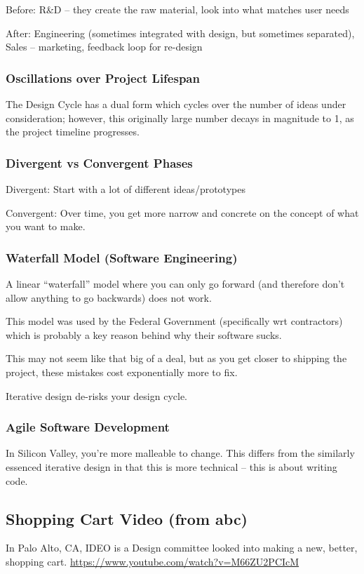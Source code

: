 Before: R\&D -- they create the raw material, look into what matches user needs

After: Engineering (sometimes integrated with design, but sometimes separated), Sales -- marketing, feedback loop for re-design

\subsubsection{Oscillations over Project Lifespan}
The Design Cycle has a dual form which cycles over the number of ideas under consideration; however, this originally large number decays in magnitude to 1, as the project timeline progresses.

\subsubsection{Divergent vs Convergent Phases}
Divergent: Start with a lot of different ideas/prototypes

Convergent: Over time, you get more narrow and concrete on the concept of what you want to make.

\subsubsection{Waterfall Model (Software Engineering)}
A linear ``waterfall'' model where you can only go forward (and therefore don't allow anything to go backwards) does not work.

This model was used by the Federal Government (specifically wrt contractors) which is probably a key reason behind why their software sucks.

\begin{important}
This may not seem like that big of a deal, but as you get closer to shipping the project, these mistakes cost exponentially more to fix.
\end{important}

Iterative design de-risks your design cycle.

\subsubsection{Agile Software Development}
In Silicon Valley, you're more malleable to change. This differs from the similarly essenced iterative design in that this is more technical -- this is about writing code.

\subsection{Shopping Cart Video (from abc)}
In Palo Alto, CA, IDEO is a Design committee looked into making a new, better, shopping cart. \href{https://www.youtube.com/watch?v=M66ZU2PCIcM}{https://www.youtube.com/watch?v=M66ZU2PCIcM}

